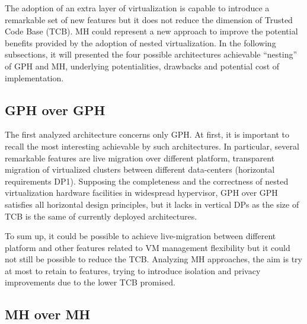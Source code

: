 \documentclass{sig-alternate}
\begin{document}
The adoption of an extra layer of virtualization is capable to introduce a remarkable set of new features but it does not reduce the dimension of Trusted Code Base (TCB). 
MH could represent a new approach to improve the potential benefits provided by the adoption of nested virtualization. In the following subsections, it will presented the four possible architectures achievable ``nesting'' of GPH and MH, underlying potentialities, drawbacks and potential cost of implementation.

\subsection{GPH over GPH}

The first analyzed architecture concerns only GPH. At first, it is important to recall the most interesting achievable by such architectures. In particular, several remarkable features are live migration over different platform, transparent migration of virtualized clusters between different data-centers (horizontal requirements DP1).
Supposing the completeness and the correctness of nested virtualization hardware facilities in widespread hypervisor, GPH over GPH satisfies all horizontal design principles, but it lacks in vertical DPs as the size of TCB is the same of currently deployed architectures.

To sum up, it could be possible to achieve live-migration between different platform and other features related to VM management flexibility but it could not still be possible to reduce the TCB. Analyzing MH approaches, the aim is try at most to retain to features, trying to introduce isolation and privacy improvements due to the lower TCB promised.


\subsection{MH over MH}
\end{document}

